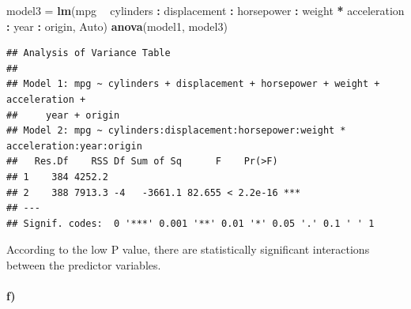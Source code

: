 \documentclass[]{article}
\newenvironment{Shaded}{\begin{snugshade}}{\end{snugshade}}
\newcommand{\KeywordTok}[1]{\textcolor[rgb]{0.13,0.29,0.53}{\textbf{#1}}}
\newcommand{\StringTok}[1]{\textcolor[rgb]{0.31,0.60,0.02}{#1}}
\newcommand{\OperatorTok}[1]{\textcolor[rgb]{0.81,0.36,0.00}{\textbf{#1}}}
\newcommand{\NormalTok}[1]{#1}
\let\oldparagraph\paragraph
\renewcommand{\paragraph}[1]{\oldparagraph{#1}\mbox{}}
\begin{document}
\begin{Shaded}
\begin{Highlighting}[]
\NormalTok{model3 =}\StringTok{ }\KeywordTok{lm}\NormalTok{(mpg }\OperatorTok{~}\StringTok{ }\NormalTok{cylinders }\OperatorTok{:}\StringTok{ }\NormalTok{displacement }\OperatorTok{:}\StringTok{ }\NormalTok{horsepower }\OperatorTok{:}\StringTok{ }\NormalTok{weight }\OperatorTok{*}\StringTok{ }\NormalTok{acceleration }\OperatorTok{:}\StringTok{ }\NormalTok{year }\OperatorTok{:}\StringTok{ }\NormalTok{origin, Auto)}
\KeywordTok{anova}\NormalTok{(model1, model3)}
\end{Highlighting}
\end{Shaded}

\begin{verbatim}
## Analysis of Variance Table
## 
## Model 1: mpg ~ cylinders + displacement + horsepower + weight + acceleration + 
##     year + origin
## Model 2: mpg ~ cylinders:displacement:horsepower:weight * acceleration:year:origin
##   Res.Df    RSS Df Sum of Sq      F    Pr(>F)    
## 1    384 4252.2                                  
## 2    388 7913.3 -4   -3661.1 82.655 < 2.2e-16 ***
## ---
## Signif. codes:  0 '***' 0.001 '**' 0.01 '*' 0.05 '.' 0.1 ' ' 1
\end{verbatim}

According to the low P value, there are statistically significant
interactions between the predictor variables.

\paragraph{f)}\label{f}

\begin{Shaded}
\end{Shaded}
\end{document}
